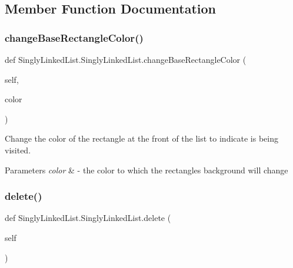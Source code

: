 \subsection{Member Function Documentation}
\mbox{\label{class_singly_linked_list_1_1_singly_linked_list_a83ac65fabad4d24148ee485a8c4f372f}} 
\subsubsection{\texorpdfstring{change\+Base\+Rectangle\+Color()}{changeBaseRectangleColor()}}
{\footnotesize\ttfamily def Singly\+Linked\+List.\+Singly\+Linked\+List.\+change\+Base\+Rectangle\+Color (\begin{DoxyParamCaption}\item[{}]{self,  }\item[{}]{color }\end{DoxyParamCaption})}



Change the color of the rectangle at the front of the list to indicate is being visited. 


\begin{DoxyParams}{Parameters}
{\em color} & -\/ the color to which the rectangle\textquotesingle{}s background will change \\
\hline
\end{DoxyParams}
\mbox{\label{class_singly_linked_list_1_1_singly_linked_list_abdf6af051078edb7113bda7446188175}} 
\subsubsection{\texorpdfstring{delete()}{delete()}}
{\footnotesize\ttfamily def Singly\+Linked\+List.\+Singly\+Linked\+List.\+delete (\begin{DoxyParamCaption}\item[{}]{self }\end{DoxyParamCaption})}



